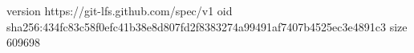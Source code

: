 version https://git-lfs.github.com/spec/v1
oid sha256:434fc83c58f0efc41b38e8d807fd2f8383274a99491af7407b4525ec3e4891c3
size 609698
